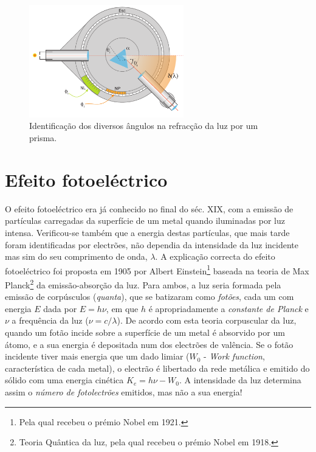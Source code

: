 \documentclass[a4paper,twoside,11pt]{report}      %
\begin{document}
\begin{figure}[h]
	\centering 
	\includegraphics[width=0.6\textwidth]{Babinet3}
	\caption{Identificação dos diversos ângulos na refracção da luz por um prisma.
	\label{fig:babinet3}} 
\end{figure}




\newpage


\section{\sf Efeito fotoeléctrico}
O efeito fotoeléctrico era já conhecido no final do séc. XIX, com a emissão  de partículas carregadas da superfície de um metal quando iluminadas por luz intensa. Verificou-se também que a energia destas partículas, que mais tarde foram identificadas por electrões, não dependia da intensidade da luz incidente mas sim do  seu comprimento de onda, $\lambda$.  A explicação correcta do efeito fotoeléctrico foi proposta em 1905 por Albert Einstein\footnote{Pela qual recebeu o prémio Nobel em 1921.} baseada na teoria de Max Planck\footnote{Teoria Quântica da luz, pela qual recebeu o prémio Nobel em 1918.} da emissão-absorção da luz. Para ambos, a luz seria formada pela emissão de  corpúsculos (\emph{quanta}), que se batizaram como \emph{fotões}, cada um com energia $E$  dada por $E = h \nu$, em que $h$ é apropriadamente a \emph{constante de Planck} e $\nu$ a frequência da luz ($\nu=c/\lambda$).  De acordo com esta teoria corpuscular da luz, quando um fotão incide sobre a superfície de um metal é absorvido por um átomo, e a sua energia é depositada num dos electrões de valência.
 Se o fotão incidente tiver mais energia que um dado limiar ($W_0$ - \emph{Work function}, característica de cada metal), o  electrão é libertado da rede metálica e emitido do sólido com uma energia cinética $K_e = h\nu - W_0$.
A intensidade da luz determina assim o \emph{número de fotolectrões} emitidos, mas não a sua energia!
\end{document}

